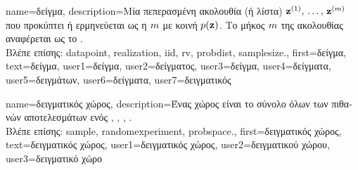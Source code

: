 {name={\foreignlanguage{greek}{δείγμα}},
	description={\foreignlanguage{greek}{Μία} 
		\foreignlanguage{greek}{πεπερασμένη ακολουθία (ή λίστα)} \linebreak ${\bf z}^{(1)}, \,\ldots, \,{\bf z}^{(m)}$ 
		\foreignlanguage{greek}{που προκύπτει ή ερμηνεύεται ως η}  $m$    
		\foreignlanguage{greek}{με κοινή}  $p({\bf z})$. \foreignlanguage{greek}{Το μήκος $m$ της  
		ακολουθίας αναφέρεται ως το} .\\
		\foreignlanguage{greek}{Βλέπε επίσης:} \gls{datapoint}, \gls{realization}, \gls{iid}, \gls{rv}, \gls{probdist}, \gls{samplesize}.},
	first={\foreignlanguage{greek}{δείγμα}},
	text={\foreignlanguage{greek}{δείγμα}},
	user1={\foreignlanguage{greek}{δείγμα}}, %
	user2={\foreignlanguage{greek}{δείγματος}}, %
	user3={\foreignlanguage{greek}{δείγμα}}, %
	user4={\foreignlanguage{greek}{δείγματα}}, %
	user5={\foreignlanguage{greek}{δειγμάτων}}, %
	user6={\foreignlanguage{greek}{δείγματα}}, %
	user7={\foreignlanguage{greek}{δειγματικός}} %
}

  {name={\foreignlanguage{greek}{δειγματικός χώρος}}, 
  	description={\foreignlanguage{greek}{Ένας}  
		\foreignlanguage{greek}{χώρος είναι το σύνολο όλων των πιθανών αποτελεσμάτων ενός} 
		 \cite{BillingsleyProbMeasure}, 
		\cite{BertsekasProb}, \cite{papoulis}, \cite{AshProbMeasure}. \\
 		\foreignlanguage{greek}{Βλέπε επίσης:} \gls{sample}, \gls{randomexperiment}, \gls{probspace}.},  
  	first={\foreignlanguage{greek}{δειγματικός χώρος}}, 
  	text={\foreignlanguage{greek}{δειγματικός χώρος}}, 
	user1={\foreignlanguage{greek}{δειγματικός χώρος}}, %
  	user2={\foreignlanguage{greek}{δειγματικού χώρου}}, %
	user3={\foreignlanguage{greek}{δειγματικό χώρο}} %
  }

